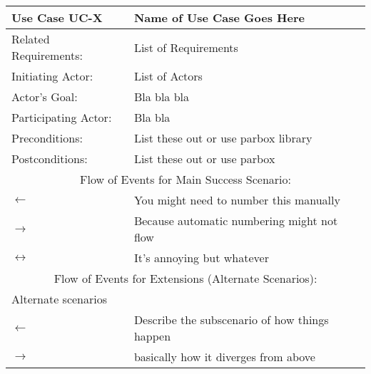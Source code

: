 


\begin{centering}
\renewcommand\arraystretch{1.3} %
\begin{longtable}{|p{1.1in} p{5in}|}
\hline
\bfseries{\color{color1}Use Case UC-X} & \bfseries{\color{color1}Name of Use Case Goes Here} \\
\hline
Related Requirements: & List of Requirements \\ 
Initiating Actor:     & List of Actors \\
Actor's Goal:         & Bla bla bla \\
Participating Actor:  & Bla bla \\
Preconditions:        & List these out or use parbox library \\
Postconditions:       & List these out or use parbox \\
\hline
\multicolumn{2}{|c|}{\color{color1}Flow of Events for Main Success Scenario:}\\
\hline
$\leftarrow$ & You might need to number this manually \\
$\rightarrow$ & Because automatic numbering might not flow \\
$\longleftrightarrow$ & It's annoying but whatever \\
\hline
\multicolumn{2}{|c|}{\color{color1}Flow of Events for Extensions (Alternate Scenarios):} \\
\hline
\multicolumn{2}{|l|}{\color{color1} Alternate scenarios} \\
\hline
$\leftarrow$ & Describe the subscenario of how things happen \\
$\rightarrow$ & basically how it diverges from above \\
\hline 
\end{longtable}

\end{centering}